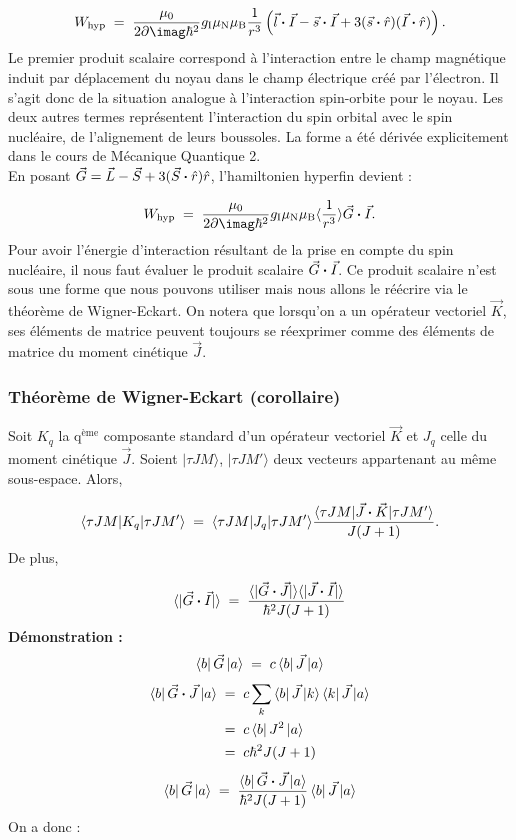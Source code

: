 \begin{equation}
    W_\text{hyp} \eq  \dfrac{\mu_0}{2\p\imag\hbar^2}g_\text{I}\mu_\text{N}\mu_\text{B}\dfrac{1}{r^3}\left( \vec{l}\Cdot\vec{I}-\vec{s}\Cdot\vec{I} + 3(\vec{s}\Cdot\hat{r})(\vec{I}\Cdot\hat{r}) \right).
\end{equation}
Le premier produit scalaire correspond à l'interaction entre le champ magnétique induit par déplacement du noyau dans le champ électrique créé par l'électron. Il s'agit donc de la situation analogue à l'interaction spin-orbite pour le noyau. Les deux autres termes représentent l'interaction du spin orbital avec le spin nucléaire, de l'alignement de leurs boussoles. La forme a été dérivée explicitement dans le cours de Mécanique Quantique 2.\\
En posant $\vec{G} = \vec{L} - \vec{S} + 3(\vec{S}\boldsymbol{\cdot}\hat{r}) \hat{r}$, l'hamiltonien hyperfin devient :

\begin{equation}
    W_\text{hyp} \eq  \dfrac{\mu_0}{2\p\imag\hbar^2}g_\text{I}\mu_\text{N}\mu_\text{B}\langle\dfrac{1}{r^3}\rangle \vec{G}\Cdot\vec{I}.
\end{equation}
Pour avoir l’énergie d’interaction résultant de la prise en compte du spin nucléaire, il nous faut évaluer le produit scalaire $\vec{G} \boldsymbol{\cdot} \vec{I}$. Ce produit scalaire n’est sous une forme que nous pouvons utiliser mais nous allons le réécrire via le théorème de Wigner-Eckart. On notera que lorsqu’on a un opérateur vectoriel $\vec{K}$, ses éléments de matrice peuvent toujours se réexprimer comme des éléments de matrice du moment cinétique $\vec{J}$.



\subsubsection{Théorème de Wigner-Eckart (corollaire)}

Soit $K_q$ la q$^\text{ème}$ composante standard d'un opérateur vectoriel $\vec{K}$ et $J_q$ celle du moment cinétique $\vec{J}$. Soient $|\tau JM\rangle$, $|\tau JM'\rangle$ deux vecteurs appartenant au même sous-espace. Alors,

\[
    \langle\tau JM|K_q|\tau JM'\rangle \; = \;   \langle\tau JM|J_q|\tau JM'\rangle\dfrac{ \langle\tau JM|\vec{J}\boldsymbol{\cdot}\vec{K}|\tau JM'\rangle}{J(J+1)}.
\]
De plus,

\[
    \langle |\vec{G}\boldsymbol{\cdot}\vec{I}| \rangle \; = \;  \dfrac{\langle |\vec{G}\boldsymbol{\cdot}\vec{J}| \rangle\langle |\vec{J}\boldsymbol{\cdot}\vec{I}| \rangle}{\hbar^2J(J+1)}
\]
\textbf{Démonstration :}
\[
    \bra{b}\vec{G}\ket{a}
    \; = \; c\bra{b}\vec{J}\ket{a}
\]
\begin{align*}
    \bra{b}\vec{G} \boldsymbol{\cdot} \vec{J}\ket{a}
    &\; = \;  c\sum_k \bra{b}\vec{J}\ket{k}\bra{k}\vec{J}\ket{a}\\
    &\; = \;  c\bra{b}J^2\ket{a}\\
    &\; = \;  c\hbar^2 J(J+1)
\end{align*}
\[
    \bra{b}\vec{G}\ket{a} \; = \; \dfrac{\bra{b}\vec{G} \boldsymbol{\cdot} \vec{J}\ket{a}}{\hbar^2 J(J+1)}\bra{b}\vec{J}\ket{a}
\]
On a donc :

